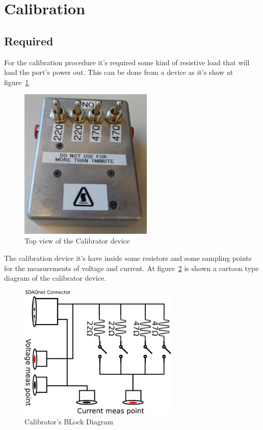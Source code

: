 \newpage
\section{Calibration}
\subsection{Required}
For the calibration procedure it's required some kind of resistive load that will load the port's power out. This can be done from a device as it's show at figure~\ref{fig:calibrator_top}.
\begin{figure}[h!]
	\centering
	\includegraphics[width=2.5in]{./pics/calibrator_top.jpg}
	\caption{Top view of the Calibrator device}
	\label{fig:calibrator_top}
\end{figure}
The calibration device it's have inside some resistors and some sampling points for the measurements of voltage and current. At figure~\ref{fig:calibrator_block} is shown a cartoon type diagram
of the calibrator device.
\begin{figure}[h!]
	\centering
	\includegraphics[width=3in]{./Artwork/calibrator_block.png}
	\caption{Calibrator's BLock Diagram}
	\label{fig:calibrator_block}
\end{figure}


